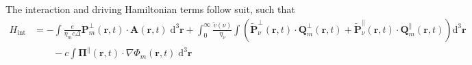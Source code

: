 \documentclass{article}
\begin{document}
The interaction and driving Hamiltonian terms follow suit, such that
\begin{equation}
\begin{split}
H_\mathrm{int} &= -\int\frac{e}{\eta_mc\Delta}\mathbf{P}_m^\perp(\mathbf{r},t)\cdot\mathbf{A}(\mathbf{r},t)\;\mathrm{d}^3\mathbf{r} + \int_0^\infty\frac{\tilde{v}(\nu)}{\eta_\nu}\int\left(\tilde{\mathbf{P}}_\nu^\perp(\mathbf{r},t)\cdot\mathbf{Q}_m^\perp(\mathbf{r},t) + \tilde{\mathbf{P}}_\nu^\parallel(\mathbf{r},t)\cdot\mathbf{Q}_m^\parallel(\mathbf{r},t)\right)\mathrm{d}^3\mathbf{r}\\
&\qquad - c\int\bm{\Pi}^\parallel(\mathbf{r},t)\cdot\nabla\Phi_m(\mathbf{r},t)\;\mathrm{d}^3\mathbf{r}\\

\end{split}
\end{equation}
\end{document}
